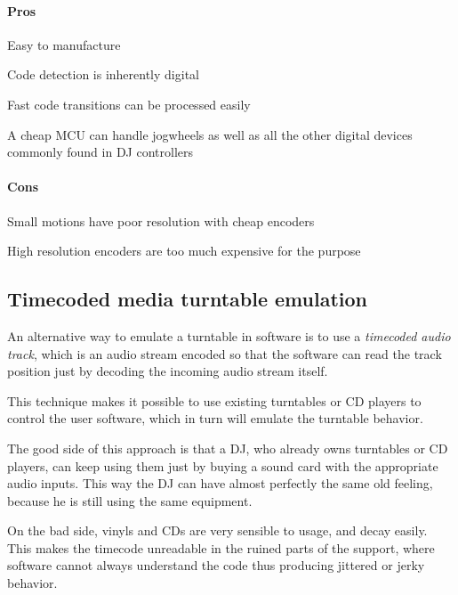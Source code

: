 \documentclass[a4paper,10pt]{article}
\begin{document}
\begin{multicols}{2}
\paragraph{Pros}
\begin{itemize*}
	\item Easy to manufacture
	\item Code detection is inherently digital
	\item Fast code transitions can be processed easily
	\item A cheap MCU can handle jogwheels as well as all the other digital
		devices commonly found in DJ controllers
\end{itemize*}


\paragraph{Cons}
\begin{itemize*}
	\item Small motions have poor resolution with cheap encoders
	\item High resolution encoders are too much expensive for the purpose
\end{itemize*}


\subsection{Timecoded media turntable emulation}

An alternative way to emulate a turntable in software is to use a
\emph{timecoded audio track}, which is an audio stream encoded so that the
software can read the track position just by decoding the incoming audio
stream itself.

This technique makes it possible to use existing turntables or CD players to
control the user software, which in turn will emulate the turntable behavior.

The good side of this approach is that a DJ, who already owns turntables or CD
players, can keep using them just by buying a sound card with the appropriate
audio inputs. This way the DJ can have almost perfectly the same old feeling,
because he is still using the same equipment.

On the bad side, vinyls and CDs are very sensible to usage, and decay easily.
This makes the timecode unreadable in the ruined parts of the support, where
software cannot always understand the code thus producing jittered or jerky
behavior.


\end{multicols}
\end{document}
